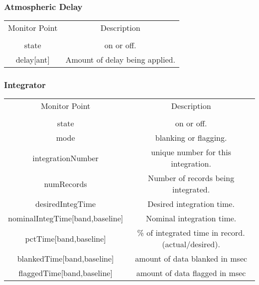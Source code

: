 \documentclass[11pt]{article}
\begin{document}
\subsubsection{Atmospheric Delay}
\label{sec:admp}
\begin{center}
\begin{tabular}{|c|c|}
\hline
Monitor Point & Description \\
&\\
\hline\hline
state  & on or off.\\
delay[ant] & Amount of delay being applied.\\
\hline
\end{tabular}
\end{center}

\subsubsection{Integrator}
\label{sec:integratormp}
\begin{center}
\begin{tabular}{|c|c|}
\hline
Monitor Point & Description \\
&\\
\hline\hline
state  & on or off.\\
mode & blanking or flagging.\\
integrationNumber & unique number for this integration.\\
numRecords & Number of records being integrated.\\
desiredIntegTime & Desired integration time.\\
nominalIntegTime[band,baseline] & Nominal integration time.\\
pctTime[band,baseline] & \% of integrated time in record. (actual/desired).\\
blankedTime[band,baseline] & amount of data blanked in msec \\
flaggedTime[band,baseline] & amount of data flagged in msec \\
\hline
\end{tabular}
\end{center}
\end{document}
